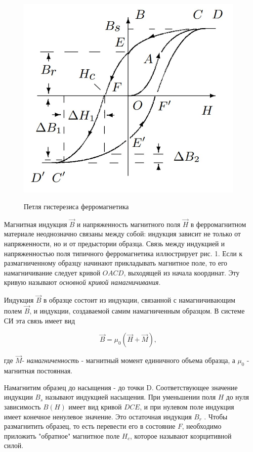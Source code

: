 \documentclass[12pt]{kiarticle} %
\begin{document}
	\begin{figure}
		\vspace{-20pt}
		\begin{center}
			\includegraphics[width=0.7\linewidth]{gist3.jpg}
			\label{fig:sdfsafd}
		\end{center}
		\vspace{-10pt}
		\caption{Петля гистерезиса ферромагнетика}
	\end{figure}

	Магнитная индукция $\vec{B}$ и напряженность магнитного поля
	$\vec{H}$ в ферромагнитном материале неоднозначно связаны
	между собой: индукция зависит не только от напряженности, но
	и от предыстории образца. Связь между индукцией
	и напряженностью поля типичного ферромагнетика иллюстрирует рис. 1. Если
	к размагниченному образцу начинают прикладывать магнитное поле, то его намагничивание следует кривой $ OACD $, выходящей
	из начала
	координат. Эту кривую называют \textit{основной кривой намагничивания}.
	
	
	Индукция $\vec{B}$ в образце состоит из индукции, связанной с намагничивающим полем
	$\vec{B}$, и индукции, создаваемой самим намагниченным
	образцом.
	В системе СИ эта связь имеет вид
	
	$$\vec{B} = \mu_{0}(\vec{H}+\vec{M}),$$
	
	где $\vec{M}$- \textit{намагниченность} - магнитный момент единичного объема образца, а $\mu_{0}$ - магнитная постоянная.
	
	Намагнитим образец до насыщения - до точки D. Соответствующее
	значение индукции $B_{s}$ называют индукцией насыщения. При уменьшении поля $H$ до нуля зависимость $B(H)$ имеет вид кривой $DCE$, и при нулевом поле индукция имеет конечное ненулевое значение. Это остаточная индукция $B_{r}$ . Чтобы размагнитить образец, то есть перевести его в состояние
	$F$, необходимо приложить "обратное" магнитное
	поле $H_{c}$, которое называют коэрцитивной силой.
	
\end{document}
